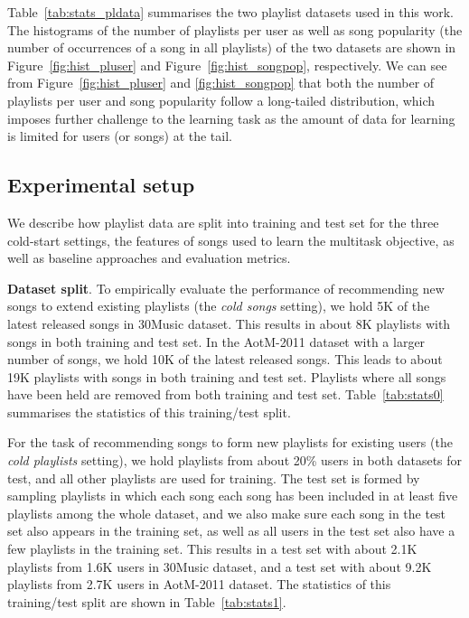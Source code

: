 Table~\ref{tab:stats_pldata} summarises the two playlist datasets used in this work.
The histograms of the number of playlists per user as well as song popularity 
(\ie the number of occurrences of a song in all playlists)
of the two datasets are shown in Figure~\ref{fig:hist_pluser} and Figure~\ref{fig:hist_songpop},
respectively.
We can see from Figure~\ref{fig:hist_pluser} and \ref{fig:hist_songpop} that both the number
of playlists per user and song popularity follow a long-tailed distribution, which imposes further challenge to the learning task as the amount
of data for learning is limited for users (or songs) at the tail.






\subsection{Experimental setup}

We describe how playlist data are split into training and test set for the three cold-start settings,
the features of songs used to learn the multitask objective, as well as baseline approaches and evaluation metrics.

{\bf Dataset split}.
To empirically evaluate the performance of recommending new songs to extend existing playlists (\ie the \emph{cold songs} setting),
we hold 5K of the latest released songs in 30Music dataset. This results in about 8K playlists with songs
in both training and test set.
In the AotM-2011 dataset with a larger number of songs, we hold 10K of the latest released songs.
This leads to about 19K playlists with songs in both training and test set.
Playlists where all songs have been held are removed from both training and test set.
Table~\ref{tab:stats0} summarises the statistics of this training/test split.

For the task of recommending songs to form new playlists for existing users (\ie the \emph{cold playlists} setting),
we hold playlists from about 20\% users in both datasets for test, and all other playlists are used for training.
The test set is formed by sampling playlists in which each song each song has been included in at least five playlists among the whole dataset,
and we also make sure each song in the test set also appears in the training set,
as well as all users in the test set also have a few playlists in the training set.
This results in a test set with about 2.1K playlists from 1.6K users in 30Music dataset,
and a test set with about 9.2K playlists from 2.7K users in AotM-2011 dataset.
The statistics of this training/test split are shown in Table~\ref{tab:stats1}.

